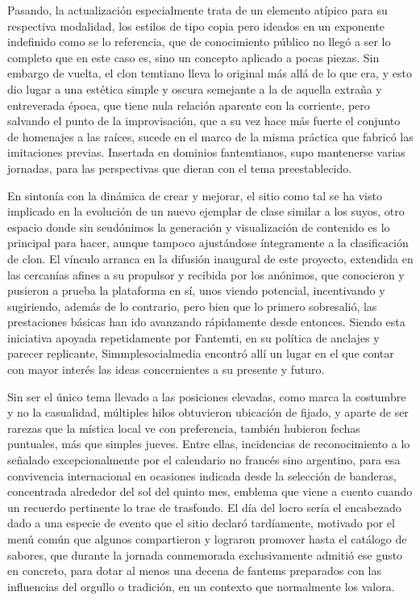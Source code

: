 \documentclass[
]{book}
\begin{document}
Pasando, la actualización especialmente trata de un elemento atípico para su respectiva modalidad, los estilos de tipo copia pero ideados en un exponente indefinido como se lo referencia, que de conocimiento público no llegó a ser lo completo que en este caso es, sino un concepto aplicado a pocas piezas. Sin embargo de vuelta, el clon temtiano lleva lo original más allá de lo que era, y esto dio lugar a una estética simple y oscura semejante a la de aquella extraña y entreverada época, que tiene nula relación aparente con la corriente, pero salvando el punto de la improvisación, que a su vez hace más fuerte el conjunto de homenajes a las raíces, sucede en el marco de la misma práctica que fabricó las imitaciones previas. Insertada en dominios fantemtianos, supo mantenerse varias jornadas, para las perspectivas que dieran con el tema preestablecido.

En sintonía con la dinámica de crear y mejorar, el sitio como tal se ha visto implicado en la evolución de un nuevo ejemplar de clase similar a los suyos, otro espacio donde sin seudónimos la generación y visualización de contenido es lo principal para hacer, aunque tampoco ajustándose íntegramente a la clasificación de clon. El vínculo arranca en la difusión inaugural de este proyecto, extendida en las cercanías afines a su propulsor y recibida por los anónimos, que conocieron y pusieron a prueba la plataforma en sí, unos viendo potencial, incentivando y sugiriendo, además de lo contrario, pero bien que lo primero sobresalió, las prestaciones básicas han ido avanzando rápidamente desde entonces. Siendo esta iniciativa apoyada repetidamente por Fantemti, en su política de anclajes y parecer replicante, Simmplesocialmedia encontró allí un lugar en el que contar con mayor interés las ideas concernientes a su presente y futuro.

Sin ser el único tema llevado a las posiciones elevadas, como marca la costumbre y no la casualidad, múltiples hilos obtuvieron ubicación de fijado, y aparte de ser rarezas que la mística local ve con preferencia, también hubieron fechas puntuales, más que simples jueves. Entre ellas, incidencias de reconocimiento a lo señalado excepcionalmente por el calendario no francés sino argentino, para esa convivencia internacional en ocasiones indicada desde la selección de banderas, concentrada alrededor del sol del quinto mes, emblema que viene a cuento cuando un recuerdo pertinente lo trae de trasfondo. El día del locro sería el encabezado dado a una especie de evento que el sitio declaró tardíamente, motivado por el menú común que algunos compartieron y lograron promover hasta el catálogo de sabores, que durante la jornada conmemorada exclusivamente admitió ese gusto en concreto, para dotar al menos una decena de fantems preparados con las influencias del orgullo o tradición, en un contexto que normalmente los valora.
\end{document}
